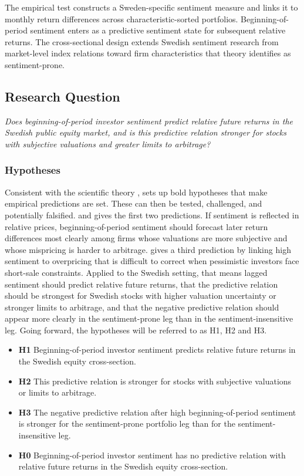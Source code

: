\documentclass[11pt]{article}
\begin{document}
The empirical test constructs a Sweden-specific sentiment measure and links it to monthly return differences across characteristic-sorted portfolios. Beginning-of-period sentiment enters as a predictive sentiment state for subsequent relative returns. The cross-sectional design extends Swedish sentiment research from market-level index relations toward firm characteristics that theory identifies as sentiment-prone.

\subsection{Research Question}
\begin{displayquote}
\textit{Does beginning-of-period investor sentiment predict relative future returns in the Swedish public equity market, and is this predictive relation stronger for stocks with subjective valuations and greater limits to arbitrage?}
\end{displayquote}

\subsubsection{Hypotheses}
Consistent with the scientific theory \citet{popper1959scientificdiscovery}, sets up bold hypotheses that make empirical predictions are set. These can then be tested, challenged, and potentially falsified. \citet{baker2006sentiment} and \citet{baker2007} gives the first two predictions. If sentiment is reflected in relative prices, beginning-of-period sentiment should forecast later return differences most clearly among firms whose valuations are more subjective and whose mispricing is harder to arbitrage. \citet{stambaugh2012short} gives a third prediction by linking high sentiment to overpricing that is difficult to correct when pessimistic investors face short-sale constraints. Applied to the Swedish setting, that means lagged sentiment should predict relative future returns, that the predictive relation should be strongest for Swedish stocks with higher valuation uncertainty or stronger limits to arbitrage, and that the negative predictive relation should appear more clearly in the sentiment-prone leg than in the sentiment-insensitive leg. Going forward, the hypotheses will be referred to as H1, H2 and H3. 

\begin{itemize}
    \item \textbf{H1} Beginning-of-period investor sentiment predicts relative future returns in the Swedish equity cross-section.
    \item \textbf{H2} This predictive relation is stronger for stocks with subjective valuations or limits to arbitrage.
    \item \textbf{H3} The negative predictive relation after high beginning-of-period sentiment is stronger for the sentiment-prone portfolio leg than for the sentiment-insensitive leg.
    \item \textbf{H0} Beginning-of-period investor sentiment has no predictive relation with relative future returns in the Swedish equity cross-section.
\end{itemize}
\end{document}
